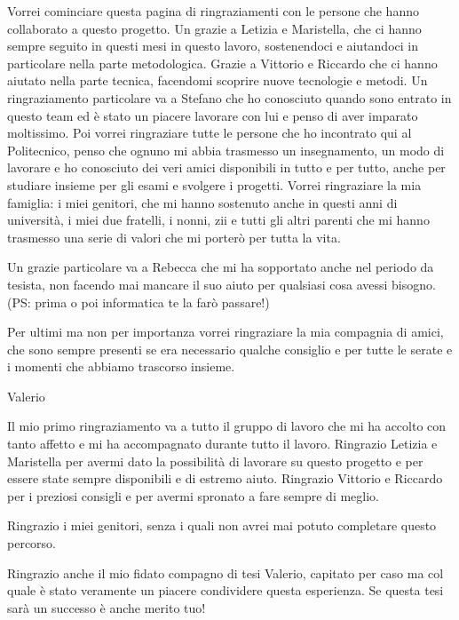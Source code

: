 Vorrei cominciare questa pagina di ringraziamenti con le persone che hanno collaborato a questo progetto.
Un grazie a Letizia e Maristella, che ci hanno sempre seguito in questi mesi in questo lavoro, sostenendoci e aiutandoci in particolare nella parte metodologica. Grazie a Vittorio e Riccardo che ci hanno aiutato nella parte tecnica, facendomi scoprire nuove tecnologie e metodi.
Un ringraziamento particolare va a Stefano che ho conosciuto quando sono entrato in questo team ed è stato un piacere lavorare con lui e penso di aver imparato moltissimo. 
Poi vorrei ringraziare tutte le persone che ho incontrato qui al Politecnico, penso che ognuno mi abbia trasmesso un insegnamento, un modo di lavorare e ho conosciuto dei veri amici disponibili in tutto e per tutto, anche per studiare insieme per gli esami e svolgere i progetti.
Vorrei ringraziare la mia famiglia: i miei genitori, che mi hanno sostenuto anche in questi anni di università, i miei due fratelli, i nonni, zii e tutti gli altri parenti che mi hanno trasmesso una serie di valori che mi porterò per tutta la vita. 

Un grazie particolare va a Rebecca che mi ha sopportato anche nel periodo da tesista, non facendo mai mancare il suo aiuto per qualsiasi cosa avessi bisogno. (PS: prima o poi informatica te la farò passare!)

Per ultimi ma non per importanza vorrei ringraziare la mia compagnia di amici, che sono sempre presenti se era necessario qualche consiglio e per tutte le serate e i momenti che abbiamo trascorso insieme.

\vspace{1cm}

\begin{flushright}
	Valerio
\end{flushright}


\clearpage

Il mio primo ringraziamento va a tutto il gruppo di lavoro che mi ha accolto con tanto affetto e mi ha accompagnato durante tutto il lavoro. Ringrazio Letizia e Maristella per avermi dato la possibilità di lavorare su questo progetto e per essere state sempre disponibili e di estremo aiuto. Ringrazio Vittorio e Riccardo per i preziosi consigli e per avermi spronato a fare sempre di meglio. 

Ringrazio i miei genitori, senza i quali non avrei mai potuto completare questo percorso.

Ringrazio anche il mio fidato compagno di tesi Valerio, capitato per caso ma col quale è stato veramente un piacere condividere questa esperienza. Se questa tesi sarà un successo è anche merito tuo!

